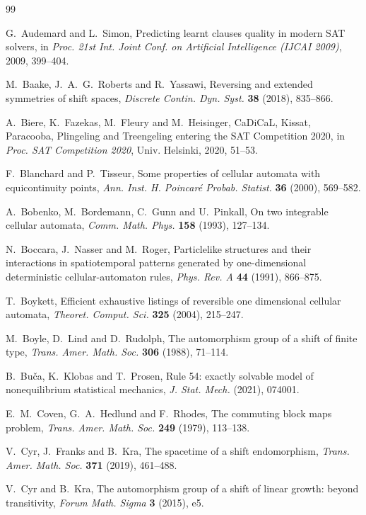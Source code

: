 \begin{thebibliography}{99}

 G.~Audemard and L.~Simon, Predicting learnt clauses quality in modern SAT solvers, in \emph{Proc. 21st Int. Joint Conf. on Artificial Intelligence (IJCAI 2009)}, 2009, 399--404.

 M.~Baake, J.~A.~G.~Roberts and R.~Yassawi, Reversing and extended symmetries of shift spaces, \emph{Discrete Contin. Dyn. Syst.} \textbf{38} (2018), 835--866.

 A.~Biere, K.~Fazekas, M.~Fleury and M.~Heisinger, CaDiCaL, Kissat, Paracooba, Plingeling and Treengeling entering the SAT Competition 2020, in \emph{Proc. SAT Competition 2020}, Univ. Helsinki, 2020, 51--53.

 F.~Blanchard and P.~Tisseur, Some properties of cellular automata with equicontinuity points, \emph{Ann. Inst. H. Poincar\'e Probab. Statist.} \textbf{36} (2000), 569--582.

 A.~Bobenko, M.~Bordemann, C.~Gunn and U.~Pinkall, On two integrable cellular automata, \emph{Comm. Math. Phys.} \textbf{158} (1993), 127--134.

 N.~Boccara, J.~Nasser and M.~Roger, Particlelike structures and their interactions in spatiotemporal patterns generated by one-dimensional deterministic cellular-automaton rules, \emph{Phys. Rev. A} \textbf{44} (1991), 866--875.

 T.~Boykett, Efficient exhaustive listings of reversible one dimensional cellular automata, \emph{Theoret. Comput. Sci.} \textbf{325} (2004), 215--247.

 M.~Boyle, D.~Lind and D.~Rudolph, The automorphism group of a shift of finite type, \emph{Trans. Amer. Math. Soc.} \textbf{306} (1988), 71--114.

 B.~Bu\v{c}a, K.~Klobas and T.~Prosen, Rule 54: exactly solvable model of nonequilibrium statistical mechanics, \emph{J. Stat. Mech.} (2021), 074001.

 E.~M.~Coven, G.~A.~Hedlund and F.~Rhodes, The commuting block maps problem, \emph{Trans. Amer. Math. Soc.} \textbf{249} (1979), 113--138.

 V.~Cyr, J.~Franks and B.~Kra, The spacetime of a shift endomorphism, \emph{Trans. Amer. Math. Soc.} \textbf{371} (2019), 461--488.

 V.~Cyr and B.~Kra, The automorphism group of a shift of linear growth: beyond transitivity, \emph{Forum Math. Sigma} \textbf{3} (2015), e5.


\end{thebibliography}
